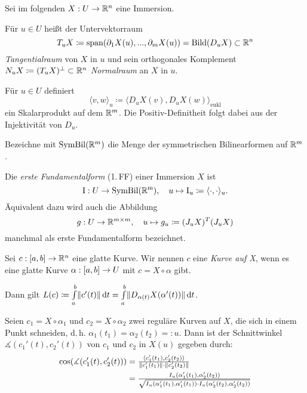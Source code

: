 \documentclass{cheat-sheet}
\newcommand{\Intabdt}[1]{\Int{a}{b}{#1}{t}}
\newcommand{\FFI}{\mathrm{I}} %
\newcommand{\Span}{\mathrm{span}} %
\begin{document}
\begin{nota}
  Sei im folgenden $X : U \to \mathbb{R}^n$ eine Immersion.
\end{nota}

\begin{defn}
  Für $u \in U$ heißt der Untervektorraum
  \[ T_u X \coloneqq \Span(\partial_1 X(u), ..., \partial_m X(u)) = \mathrm{Bild}(D_u X) \subset \R^n \]
  \emph{Tangentialraum} von $X$ in $u$ und sein orthogonales Komplement $N_u X \coloneqq (T_u X)^\perp \subset \mathbb{R}^n$ \emph{Normalraum} an $X$ in $u$.
\end{defn}

\begin{bem}
  Für $u \in U$ definiert
  \[ \langle v, w \rangle_u \coloneqq \langle D_u X(v), D_u X(w) \rangle_{\mathrm{eukl}} \]
  ein Skalarprodukt auf dem $\mathbb{R}^m$. Die Positiv-Definitheit folgt dabei aus der Injektivität von $D_u$.
\end{bem}

\begin{nota}
  Bezeichne mit $\mathrm{SymBil}(\mathbb{R}^m)$ die Menge der symmetrischen Bilinearformen auf $\mathbb{R}^m$.
\end{nota}

\begin{defn}
  Die \emph{erste Fundamentalform} (1.\,FF) einer Immersion $X$ ist
  \[ \FFI : U \to \mathrm{SymBil(\R^m)}, \quad u \mapsto \FFI_u \coloneqq \langle \cdot , \cdot \rangle_u. \]
  Äquivalent dazu wird auch die Abbildung
  \[ g : U \to \mathbb{R}^{m \times m}, \quad u \mapsto g_u \coloneqq (J_u X)^T (J_u X) \]
  manchmal als erste Fundamentalform bezeichnet.
\end{defn}

\begin{defn}
  Sei $c : \left[ a, b \right] \to \mathbb{R}^n$ eine glatte Kurve. Wir nennen $c$ eine \emph{Kurve auf X}, wenn es eine glatte Kurve $\alpha : \left[ a, b \right] \to U$ mit $c = X \circ \alpha$ gibt.
\end{defn}

\begin{bem}
  Dann gilt $L(c) \coloneqq \Intabdt{\norm{c'(t)}} = \Intabdt{\norm{D_{\alpha(t)} X(\alpha'(t))}}$.
\end{bem}

\begin{bem}
  Seien $c_1 = X \circ \alpha_1$ und $c_2 = X \circ \alpha_2$ zwei reguläre Kurven auf $X$, die sich in einem Punkt schneiden, d.\,h. $\alpha_1(t_1) = \alpha_2(t_2) =: u$. Dann ist der Schnittwinkel $\measuredangle(c_1'(t), c_2'(t))$ von $c_1$ und $c_2$ in $X(u)$ gegeben durch:
  \begin{align*}
    \cos(\measuredangle(c_1'(t), c_2'(t))) &= \tfrac{\langle c_1'(t_1) , c_2'(t_2) \rangle}{\lVert c_1'(t_1)\rVert \cdot \lVert c_2'(t_2)\rVert} \\
    &= \tfrac{I_u(\alpha_1'(t_1), \alpha_2'(t_2))}{\sqrt{I_u(\alpha_1'(t_1), \alpha_1'(t_1)) \cdot I_u(\alpha_2'(t_2), \alpha_2'(t_2))}}
  \end{align*}
\end{bem}
\end{document}
